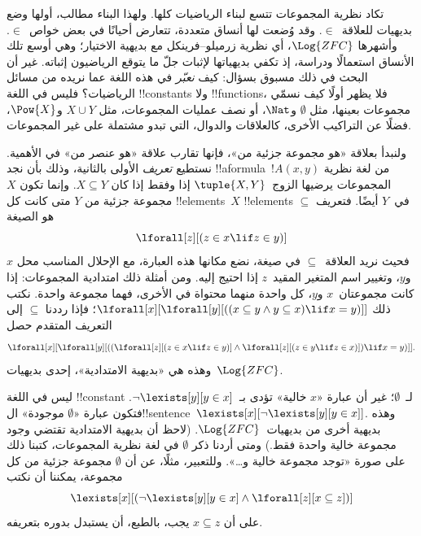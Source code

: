 \documentclass[../../../include/open-logic-section]{subfiles}
\begin{document}


تكاد نظرية المجموعات تتسع لبناء الرياضيات كلها. ولهذا البناء
مطالب، أولها وضع بديهيات للعلاقة~$\in$. وقد وُضعت لها أنساق
متعددة، تتعارض أحيانًا في بعض خواص~$\in$. وأشهرها
$\Log{ZFC}$، أي نظرية زرميلو--فرينكل مع بديهية الاختيار؛
وهي أوسع تلك الأنساق استعمالًا ودراسة، إذ تكفي بديهياتها لإثبات
جلّ ما يتوقع الرياضيون إثباته. غير أن البحث في ذلك مسبوق بسؤال:
كيف \emph{نعبّر} في هذه اللغة عما نريده من مسائل الرياضيات؟
فليس في اللغة !!{constant}s ولا !!{function}s، فلا يظهر أولًا
كيف نسمّي مجموعات بعينها، مثل $\emptyset$ و$\Nat$، أو نصف
عمليات المجموعات، مثل $X \cup Y$ و$\Pow{X}$، فضلًا عن
التراكيب الأخرى، كالعلاقات والدوال، التي تبدو مشتملة على غير
المجموعات.

ولنبدأ بعلاقة «هو مجموعة جزئية من»، فإنها تقارب علاقة «هو عنصر
من» في الأهمية. نستطيع \emph{تعريف} الأولى بالثانية، وذلك بأن
نجد !!a{formula}~$!A(x, y)$ من لغة نظرية المجموعات يرضيها
الزوج~$\tuple{X, Y}$ إذا وفقط إذا كان $X \subseteq Y$.
وإنما تكون $X$ مجموعة جزئية من $Y$ متى كانت كل
!!{element}s~$X$ !!{element}s في~$Y$ أيضًا. فتعريف
$\subseteq$ هو الصيغة
\[
\lforall[z][(z \in x \lif z \in y)]
\]
فحيث نريد العلاقة~$\subseteq$ في صيغة، نضع مكانها هذه العبارة،
مع الإحلال المناسب محل $x$ و$y$، وتغيير اسم المتغير المقيد~$z$
إذا احتيج إليه. ومن أمثلة ذلك امتدادية المجموعات: إذا كانت
مجموعتان~$x$ و$y$، كل واحدة منهما محتواة في الأخرى، فهما مجموعة
واحدة. نكتب ذلك
$\lforall[x][\lforall[y][((x \subseteq y \land y
    \subseteq x) \lif x = y)]]$؛ فإذا رددنا $\subseteq$
إلى التعريف المتقدم حصل
\[
\lforall[x][\lforall[y][((\lforall[z][(z \in x \lif z \in y)] \land
    \lforall[z][(z \in y \lif z \in x)]) \lif x = y)]].
\]
وهذه هي «بديهية الامتدادية»، إحدى بديهيات~$\Log{ZFC}$.

ليس في اللغة !!{constant} لـ~$\emptyset$؛ غير أن عبارة «$x$
خالية» تؤدى بـ~$\lnot \lexists[y][y \in x]$. فتكون عبارة
«$\emptyset$ موجودة» ال!!{sentence}~$\lexists[x][\lnot
\lexists[y][y \in x]]$. وهذه بديهية أخرى من بديهيات~$\Log{ZFC}$.
(لاحظ أن بديهية الامتدادية تقتضي وجود مجموعة خالية واحدة فقط.) ومتى
أردنا ذكر $\emptyset$ في لغة نظرية المجموعات، كتبنا ذلك على
صورة «توجد مجموعة خالية و\dots». وللتعبير، مثلًا، عن أن $\emptyset$
مجموعة جزئية من كل مجموعة، يمكننا أن نكتب
\[
\lexists[x][(\lnot\lexists[y][y \in x] \land \lforall[z][x \subseteq
    z])]
\]
على أن $x \subseteq z$ يجب، بالطبع، أن يستبدل بدوره بتعريفه.
\end{document}
